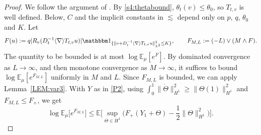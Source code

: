 \documentclass[letterpaper, 11pt,  reqno]{amsart}
\theoremstyle{definition}
\newcommand{\1}{\mathbbm 1}
\newcommand{\0}{\mathbf 0}
\newcommand{\E}{\mathbb{E}}
\newcommand{\nb}{\nabla}
\newcommand{\les}{\lesssim}
\newcommand{\jb}[1]
{\langle #1 \rangle}
\newcommand{\ind}{\mathbbm 1}
\numberwithin{equation}{section}
\numberwithin{theorem}{section}
\begin{document}
\begin{proof}
We follow the argument of \cite[Proposition~3.1]{TolWeb}. By \eqref{s4:thetabound},
$\theta_t(v)\le\theta_0$, so $T_{t,v}$ is well defined. Below, $C$ and the implicit constants in $\les$ depend only on $p$, $q$,
$\theta_0$ and $K$. Let
\[
F(u):=q|R_v(D_t^{-1}\jb\nb T_{t,v}u)|\ind_{\{\|v+D_t^{-1}\jb\nb T_{t,v}u\|_{L^2}^2\le K\}},
\qquad F_{M,L}:=(-L)\vee(M\wedge F).
\]
The quantity to be bounded is at most $\log\E_\mu[e^{F}]$. By dominated convergence as
$L\to\infty$, and then monotone convergence as $M\to\infty$, it suffices to bound
$\log\E_\mu[e^{F_{M,L}}]$ uniformly in $M$ and $L$. Since $F_{M,L}$ is bounded, we can apply
Lemma~\ref{LEM:var3}. With $Y$ as in \eqref{P2}, using
$\int_0^1\|\dot\Theta\|_{H^1}^2\ge\|\Theta(1)\|_{H^1}^2$ and $F_{M,L}\le F_+$, we get
\[
\log\E_\mu\big[e^{F_{M,L}}\big]\le\E\Big[\sup_{\Theta\in H^1}\Big(F_+(Y_1+\Theta)-\frac12\|\Theta\|_{H^1}^2\Big)\Big].
\]


\end{proof}
\end{document}
